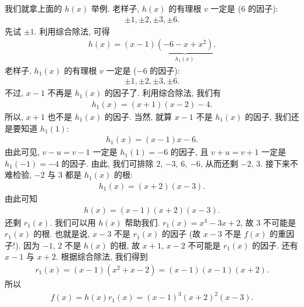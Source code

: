 \begin{example}
    我们就拿上面的 $h(x)$ 举例. 老样子, $h(x)$ 的有理根 $v$ 一定是 ($6$ 的因子):
    \begin{align*}
        \pm 1, \pm 2, \pm 3, \pm 6.
    \end{align*}
    先试 $\pm 1$. 利用综合除法, 可得
    \begin{align*}
        h(x) = (x - 1) \underbrace{(-6 - x + x^2)}_{h_1 (x)}.
    \end{align*}
    老样子, $h_1 (x)$ 的有理根 $v$ 一定是 ($-6$ 的因子):
    \begin{align*}
        \pm 1, \pm 2, \pm 3, \pm 6.
    \end{align*}
    不过, $x-1$ 不再是 $h_1 (x)$ 的因子了. 利用综合除法, 我们有
    \begin{align*}
        h_1 (x) = (x + 1) (x - 2) - 4.
    \end{align*}
    所以, $x+1$ 也不是 $h_1 (x)$ 的因子. 当然, 就算 $x-1$ 不是 $h_1 (x)$ 的因子, 我们还是要知道 $h_1 (1)$:
    \begin{align*}
        h_1 (x) = (x - 1) x - 6.
    \end{align*}
    由此可见, $v - u = v - 1$ 一定是 $h_1 (1) = -6$ 的因子, 且 $v + u = v + 1$ 一定是 $h_1 (-1) = -4$ 的因子. 由此, 我们可排除 $2$, $-3$, $6$, $-6$, 从而还剩 $-2$, $3$. 接下来不难检验, $-2$ 与 $3$ 都是 $h_1 (x)$ 的根:
    \begin{align*}
        h_1 (x) = (x + 2) (x - 3).
    \end{align*}
    由此可知
    \begin{align*}
        h(x) = (x - 1) (x + 2) (x - 3).
    \end{align*}
    还剩 $r_1 (x)$. 我们可以用 $h(x)$ 帮助我们. $r_1 (x) = x^3 - 3x + 2$, 故 $3$ 不可能是 $r_1 (x)$ 的根. 也就是说, $x - 3$ 不是 $r_1 (x)$ 的因子 (故 $x - 3$ 不是 $f(x)$ 的重因子!). 因为 $-1$, $2$ 不是 $h(x)$ 的根, 故 $x+1$, $x-2$ 不可能是 $r_1 (x)$ 的因子. 还有 $x - 1$ 与 $x + 2$. 根据综合除法, 我们得到
    \begin{align*}
        r_1 (x) = (x - 1) (x^2 + x - 2) = (x - 1) (x - 1) (x + 2).
    \end{align*}
    所以
    \begin{align*}
        f(x) = h(x) r_1 (x) = (x-1)^3 (x+2)^2 (x-3).
    \end{align*}
\end{example}

